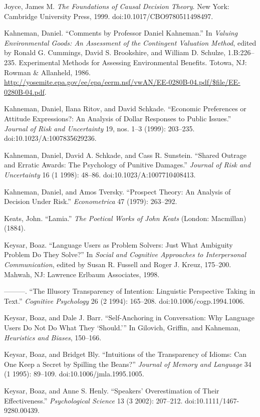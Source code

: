 {
 Joyce, James M. \textit{The Foundations of Causal Decision
Theory}. New York: Cambridge University Press, 1999.
doi:10.1017/CBO9780511498497.}

{
 Kahneman, Daniel. ``Comments by Professor Daniel
Kahneman.'' In \textit{Valuing Environmental Goods:
An Assessment of the Contingent Valuation Method}, edited by Ronald G.
Cummings, David S. Brookshire, and William D. Schulze, 1.B:226--235.
Experimental Methods for Assessing Environmental Benefits. Totowa, NJ:
Rowman \& Allanheld, 1986.
\url{http://yosemite.epa.gov/ee/epa/eerm.nsf/vwAN/EE-0280B-04.pdf/\$file/EE-0280B-04.pdf}.}

{
 Kahneman, Daniel, Ilana Ritov, and David Schkade.
``Economic Preferences or Attitude Expressions?: An
Analysis of Dollar Responses to Public Issues.''
\textit{Journal of Risk and Uncertainty} 19, nos. 1--3 (1999):
203--235. doi:10.1023/A:1007835629236.}

{
 Kahneman, Daniel, David A. Schkade, and Cass R. Sunstein.
``Shared Outrage and Erratic Awards: The Psychology of
Punitive Damages.'' \textit{Journal of Risk and
Uncertainty} 16 (1 1998): 48--86. doi:10.1023/A:1007710408413.}

{
 Kahneman, Daniel, and Amos Tversky. ``Prospect
Theory: An Analysis of Decision Under Risk.''
\textit{Econometrica} 47 (1979): 263--292.}

{
 Keats, John. ``Lamia.''
\textit{The Poetical Works of John Keats} (London: Macmillan) (1884).}

{
 Keysar, Boaz. ``Language Users as Problem
Solvers: Just What Ambiguity Problem Do They Solve?''
In \textit{Social and Cognitive Approaches to Interpersonal
Communication}, edited by Susan R. Fussell and Roger J. Kreuz,
175--200. Mahwah, NJ: Lawrence Erlbaum Associates, 1998.}

{
 {}---{}---{}---. ``The Illusory Transparency of
Intention: Linguistic Perspective Taking in Text.''
\textit{Cognitive Psychology} 26 (2 1994): 165--208.
doi:10.1006/cogp.1994.1006.}

{
 Keysar, Boaz, and Dale J. Barr. ``Self-Anchoring
in Conversation: Why Language Users Do Not Do What They
`Should.''' In
Gilovich, Griffin, and Kahneman, \textit{Heuristics and Biases},
150--166.}

{
 Keysar, Boaz, and Bridget Bly. ``Intuitions of
the Transparency of Idioms: Can One Keep a Secret by Spilling the
Beans?'' \textit{Journal of Memory and Language} 34
(1 1995): 89--109. doi:10.1006/jmla.1995.1005.}

{
 Keysar, Boaz, and Anne S. Henly.
``Speakers' Overestimation of Their
Effectiveness.'' \textit{Psychological Science} 13 (3
2002): 207--212. doi:10.1111/1467-9280.00439.}

